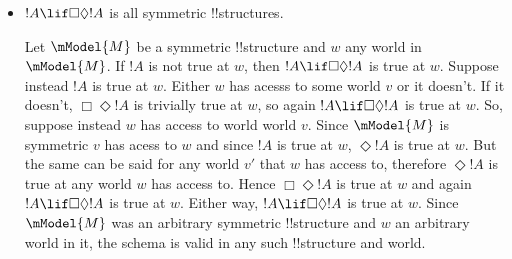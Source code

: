 \documentclass[../../../../include/open-logic-section]{subfiles}
\begin{document}
\begin{prob}
\begin{ans}
\begin{itemize}
		\item $!A \lif \Box \Diamond !A$ is all symmetric !!{structure}s. 
		
		Let $\mModel{M}$ be a symmetric !!{structure} and $w$ any world in
		$\mModel{M}$. If $!A$ is not true at $w$, then $!A \lif 
		\Box \Diamond !A$ is true at $w$. Suppose instead $!A$ is true at $w$.
		Either $w$ has acesss to some world $v$ or it doesn't. If it 
		doesn't, $\Box\Diamond!A$ is trivially true at $w$, so again 
		$!A \lif \Box \Diamond !A$ is true at $w$. So, suppose instead
		$w$ has access to world world $v$. Since $\mModel{M}$ is symmetric
		$v$ has acess to $w$ and since $!A$ is true at $w$, $\Diamond!A$
		is true at $w$. But the same can be said for any world $v'$ that
		$w$ has access to, therefore $\Diamond!A$ is true at any world $w$
		has access to. Hence $\Box\Diamond!A$ is true at $w$ and again
		$!A\lif\Box\Diamond!A$ is true at $w$. Either way, 
		$!A \lif 
		\Box \Diamond !A$ is true at $w$. Since $\mModel{M}$ was an 
		arbitrary symmetric !!{structure} and $w$ an arbitrary world in it,
		the schema is valid in any such !!{structure} and world. 
	\end{itemize}
	\end{ans}
\end{prob}
\end{document}
